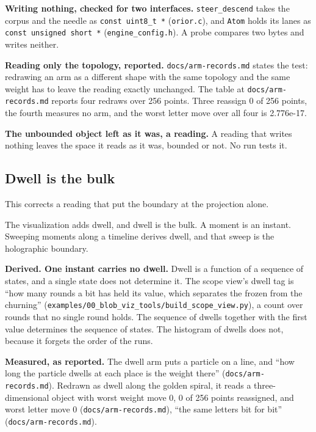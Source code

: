 \textbf{Writing nothing, checked for two interfaces.} \texttt{steer\_\allowbreak{}descend} takes the corpus and the needle as \texttt{const uint8\_\allowbreak{}t *} (\texttt{orior.\allowbreak{}c}), and \texttt{Atom} holds its lanes as \texttt{const unsigned short *} (\texttt{engine\_\allowbreak{}config.\allowbreak{}h}). A probe compares two bytes and writes neither.

\textbf{Reading only the topology, reported.} \texttt{docs/\allowbreak{}arm-\allowbreak{}records.\allowbreak{}md} states the test: redrawing an arm as a different shape with the same topology and the same weight has to leave the reading exactly unchanged. The table at \texttt{docs/\allowbreak{}arm-\allowbreak{}records.\allowbreak{}md} reports four redraws over 256 points. Three reassign 0 of 256 points, the fourth measures no arm, and the worst letter move over all four is 2.776e-17.

\textbf{The unbounded object left as it was, a reading.} A reading that writes nothing leaves the space it reads as it was, bounded or not. No run tests it.

\subsection{\texorpdfstring{Dwell is the bulk}{Dwell is the bulk}}

This corrects a reading that put the boundary at the projection alone.

The visualization adds dwell, and dwell is the bulk. A moment is an instant. Sweeping moments along a timeline derives dwell, and that sweep is the holographic boundary.

\textbf{Derived. One instant carries no dwell.} Dwell is a function of a sequence of states, and a single state does not determine it. The scope view's dwell tag is “how many rounds a bit has held its value, which separates the frozen from the churning” (\texttt{examples/\allowbreak{}00\_\allowbreak{}blob\_\allowbreak{}viz\_\allowbreak{}tools/\allowbreak{}build\_\allowbreak{}scope\_\allowbreak{}view.\allowbreak{}py}), a count over rounds that no single round holds. The sequence of dwells together with the first value determines the sequence of states. The histogram of dwells does not, because it forgets the order of the runs.

\textbf{Measured, as reported.} The dwell arm puts a particle on a line, and “how long the particle dwells at each place is the weight there” (\texttt{docs/\allowbreak{}arm-\allowbreak{}records.\allowbreak{}md}). Redrawn as dwell along the golden spiral, it reads a three-dimensional object with worst weight move 0, 0 of 256 points reassigned, and worst letter move 0 (\texttt{docs/\allowbreak{}arm-\allowbreak{}records.\allowbreak{}md}), “the same letters bit for bit” (\texttt{docs/\allowbreak{}arm-\allowbreak{}records.\allowbreak{}md}).

